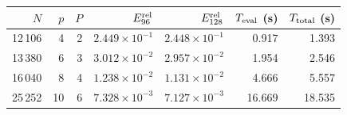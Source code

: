 \begin{tabular}{@{}rrrrrrr@{}}
\toprule
$N$ & $p$ & $P$ & $E_{96}^{\rm rel}$ & $E_{128}^{\rm rel}$ & $T_{\rm eval}$ (s) & $T_{\rm total}$ (s)\\
\midrule
12\,106 & 4 & 2 & $2.449\times10^{-1}$ & $2.448\times10^{-1}$ & 0.917 & 1.393\\
13\,380 & 6 & 3 & $3.012\times10^{-2}$ & $2.957\times10^{-2}$ & 1.954 & 2.546\\
16\,040 & 8 & 4 & $1.238\times10^{-2}$ & $1.131\times10^{-2}$ & 4.666 & 5.557\\
25\,252 & 10 & 6 & $7.328\times10^{-3}$ & $7.127\times10^{-3}$ & 16.669 & 18.535\\
\bottomrule
\end{tabular}

